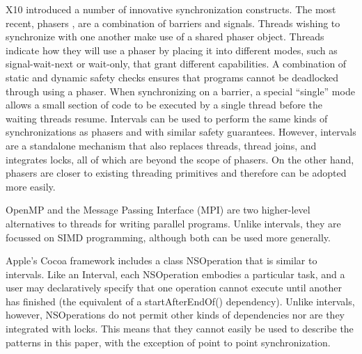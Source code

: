 X10 \cite{Charles2005, Saraswat2010} introduced a number of innovative
synchronization constructs. The most recent, phasers
\cite{Shirako2008, Shirako2010}, are a combination of barriers and
signals. Threads wishing to synchronize with one another make use of a
shared phaser object.  Threads indicate how they will use a phaser by
placing it into different modes, such as signal-wait-next or
wait-only, that grant different capabilities. A combination of static
and dynamic safety checks ensures that programs cannot be deadlocked
through using a phaser. When synchronizing on a barrier, a special
“single” mode allows a small section of code to be executed by a
single thread before the waiting threads resume. Intervals can be used
to perform the same kinds of synchronizations as phasers and with
similar safety guarantees. However, intervals are a standalone
mechanism that also replaces threads, thread joins, and integrates
locks, all of which are beyond the scope of phasers. On the other
hand, phasers are closer to existing threading primitives and
therefore can be adopted more easily.

OpenMP \cite{OpenMP2008} and the Message Passing Interface (MPI)
\cite{MPI2009} are two higher-level alternatives to threads for
writing parallel programs. Unlike intervals, they are focussed on SIMD
programming, although both can be used more generally.

Apple's Cocoa framework includes a class NSOperation \cite{Apple2008}
that is similar to intervals. Like an Interval, each NSOperation
embodies a particular task, and a user may declaratively specify that
one operation cannot execute until another has finished (the
equivalent of a startAfterEndOf() dependency). Unlike intervals,
however, NSOperations do not permit other kinds of dependencies nor
are they integrated with locks. This means that they cannot easily be
used to describe the patterns in this paper, with the exception of
point to point synchronization.

